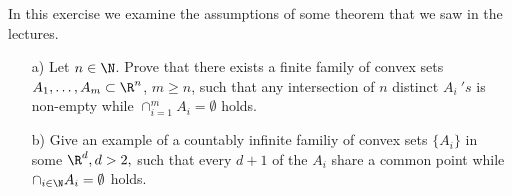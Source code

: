 In this exercise we examine the assumptions of some theorem that we saw in the lectures.
\begin{enumerate} 
\item[a)] Let $n\in \N$. Prove that there exists a finite family of convex sets $A_{1},\dots, A_{m}\subset\R^n$, $m\geq n$, such that any intersection of $n$ distinct $A_{i}~'s$ is non-empty while $\cap_{i=1}^{m}A_{i}=\emptyset$ holds.

\item[b)] Give an example of a countably infinite familiy of convex sets $\{A_{i}\}$ in some $\R^{d}, d>2,$ such that every $d+1$ of the $A_{i}$ share a common point while $\cap_{i\in\N}A_{i}=\emptyset$ holds. 

\end{enumerate}
